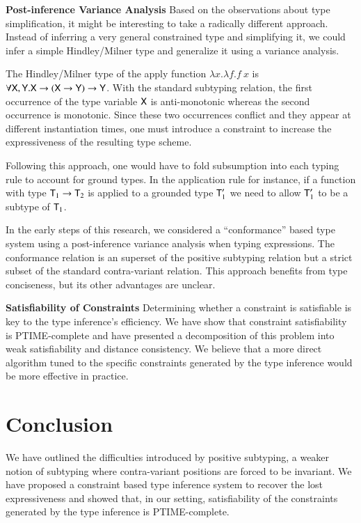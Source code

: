 \documentclass{report}
\begin{document}
  \noindent\textbf{Post-inference Variance Analysis}
  Based on the observations about type simplification, it might be interesting
  to take a radically different approach. Instead of inferring a very general constrained type
  and simplifying it, we could infer a simple Hindley/Milner type
  and generalize it using a variance analysis.
  
  The Hindley/Milner type of the apply function $\lambda x.\lambda f.f\ x$ is
  $\forall\textsf{X},\textsf{Y}.\textsf{X}\rightarrow(\textsf{X}\rightarrow\textsf{Y})\rightarrow\textsf{Y}$.
  With the standard subtyping relation, the first occurrence of the type
  variable $\textsf{X}$ is anti-monotonic whereas the second occurrence is
  monotonic. Since these two occurrences conflict and they appear at
  different instantiation times, one must introduce a constraint to increase
  the expressiveness of the resulting type scheme.
  
  Following this approach, one would have to fold subsumption
  into each typing rule to account for ground types. In the
  application rule for instance, if a function with type $\textsf{T}_1\rightarrow\textsf{T}_2$
  is applied to a grounded type $\textsf{T}_1'$ we need to allow $\textsf{T}_1'$
  to be a subtype of $\textsf{T}_1$.
  
  In the early steps of this research, we considered a ``conformance'' based type
  system using a post-inference variance analysis when typing expressions.
  The conformance relation is an superset of the positive subtyping relation
  but a strict subset of the standard contra-variant relation. This approach
  benefits from type conciseness, but its other advantages are unclear.
  
  \noindent\textbf{Satisfiability of Constraints} Determining whether a constraint is
  satisfiable is key to the type inference's efficiency. We have show that constraint satisfiability
  is PTIME-complete and have presented a decomposition of this problem into weak satisfiability
  and distance consistency. We believe that a more direct algorithm tuned to the specific
  constraints generated by the type inference would be more effective in
  practice.
    
  \section{Conclusion}
  We have outlined the difficulties introduced by positive subtyping, a weaker
  notion of subtyping where contra-variant positions are forced to be
  invariant. We have proposed a constraint based type inference system to
  recover the lost expressiveness and showed that, in our setting,
  satisfiability of the constraints generated by the type inference
  is PTIME-complete.
  
\end{document}
